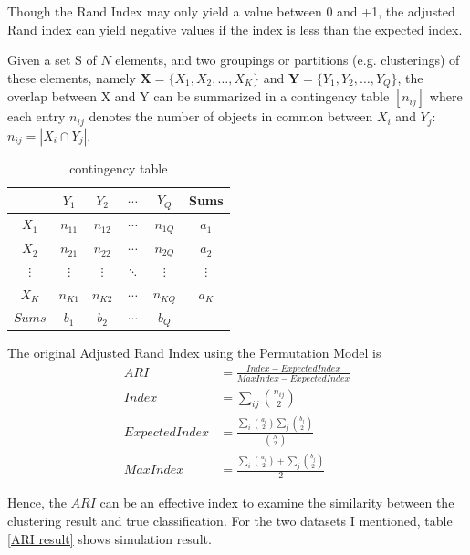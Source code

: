 \documentclass[12pt,a4paper]{article}
\begin{document}
Though the Rand Index may only yield a value between 0 and +1, the adjusted Rand index can yield negative values if the index is less than the expected index.

Given a set S of $N$ elements, and two groupings or partitions (e.g. clusterings) of these elements, namely $\mathbf{X}=\{X_{1},X_{2},\ldots ,X_{K}\}$ and $\mathbf{Y}=\{Y_{1},Y_{2},\ldots ,Y_{Q}\}$, the overlap between X and Y can be summarized in a contingency table $\left[n_{ij}\right]$ where each entry $n_{ij}$ denotes the number of objects in common between $X_i$ and $Y_j$: $n_{ij}=|X_{i} \cap Y_{j}|$.

\begin{table}
\centering
\begin{tabular}{c c c c c c}
\hline
\hline
~ & $Y_1$ &	$Y_2$ &	$\cdots$ & $Y_Q$  & Sums \\[6pt]
\hline
$X_1$ &	$n_{11}$ & 	$n_{12}$ & 	$\cdots$  &	$n_{1Q}$  &	$a_1$ \\[6pt]
\hline
$X_2$ & $n_{21}$ 	& $n_{22} $	& $\cdots$	& $n_{2Q}$	& $a_2$ \\[6pt]
\hline
$\vdots$ & $\vdots$ & $\vdots$ & $\ddots$ & $\vdots$ & $\vdots$ \\[6pt]
\hline
$X_K$ & $n_{K1}$ & $n_{K2}$ & $\cdots$ & $n_{KQ}$ & $a_K$ \\[6pt]
\hline
$Sums$ & $b_1$ & $b_2$ & $\cdots$ &$b_Q$ & ~\\[6pt]
\hline
\hline
\end{tabular}
\caption{contingency table}
\end{table}

The original Adjusted Rand Index using the Permutation Model is
\begin{equation}
\begin{aligned}
ARI &= \frac{Index-ExpectedIndex}{MaxIndex-ExpectedIndex} \\[6pt]
Index &= \sum_{ij}\binom{n_{ij}}{2} \\[6pt]
ExpectedIndex &= \frac{\sum_{i}\binom{a_i}{2}\sum_{j}\binom{b_j}{2}}{\binom{N}{2}} \\[6pt]
MaxIndex &= \frac{\sum_{i}\binom{a_i}{2}+\sum_{j}\binom{b_j}{2}}{2}
\end{aligned}
\end{equation}

Hence, the $ARI$ can be an effective index to examine the similarity between the clustering result and true classification. For the two datasets I mentioned, table \ref{ARI result} shows simulation result.
\end{document}
